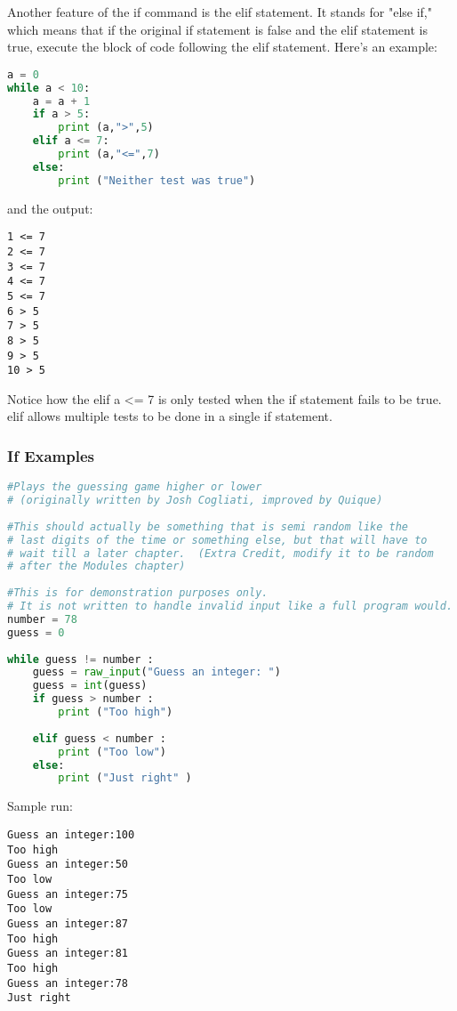 Another feature of the if command is the elif statement. It stands for "else
if," which means that if the original if statement is false and the elif
statement is true, execute the block of code following the elif statement.
Here's an example:
\lstset{basicstyle=\scriptsize, numbers=left, captionpos=b, tabsize=4}
\begin{lstlisting}[caption=ifloop.py,language={Python},
xleftmargin=15pt, label=lst:ifloop]
a = 0
while a < 10:
    a = a + 1
    if a > 5:
        print (a,">",5)
    elif a <= 7:
        print (a,"<=",7)
    else:
        print ("Neither test was true")
\end{lstlisting}
and the output:
\scriptsize
\begin{verbatim}
1 <= 7
2 <= 7
3 <= 7
4 <= 7
5 <= 7
6 > 5
7 > 5
8 > 5
9 > 5
10 > 5
\end{verbatim}
\normalsize

Notice how the elif a <= 7 is only tested when the if statement fails to be
true. elif allows multiple tests to be done in a single if statement.
\subsubsection{If Examples}
\lstset{basicstyle=\scriptsize, numbers=left, captionpos=b, tabsize=4}
\begin{lstlisting}[caption=High\_low.py,language={Python},
xleftmargin=15pt, label=lst:highlow]
#Plays the guessing game higher or lower 
# (originally written by Josh Cogliati, improved by Quique)
 
#This should actually be something that is semi random like the
# last digits of the time or something else, but that will have to
# wait till a later chapter.  (Extra Credit, modify it to be random
# after the Modules chapter)
 
#This is for demonstration purposes only. 
# It is not written to handle invalid input like a full program would.
number = 78
guess = 0
 
while guess != number : 
    guess = raw_input("Guess an integer: ")
    guess = int(guess)
    if guess > number :
        print ("Too high")
 
    elif guess < number :
        print ("Too low")
    else:
        print ("Just right" )
\end{lstlisting}

Sample run:
\scriptsize
\begin{verbatim}
Guess an integer:100
Too high
Guess an integer:50
Too low
Guess an integer:75
Too low
Guess an integer:87
Too high
Guess an integer:81
Too high
Guess an integer:78
Just right
\end{verbatim}
\normalsize

